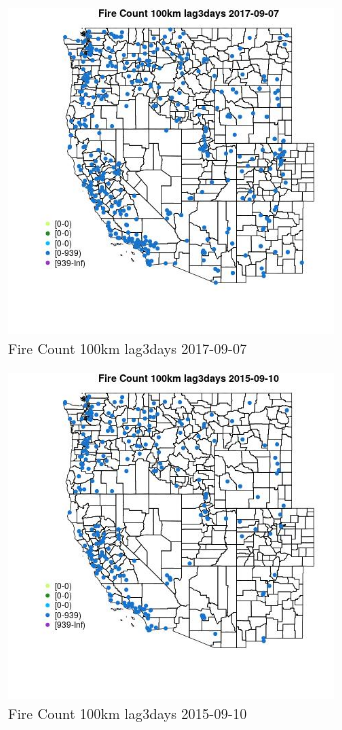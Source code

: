 \begin{figure} 
\centering  
\includegraphics[width=0.77\textwidth]{Code_Outputs/Report_ML_input_PM25_Step4_part_e_de_duplicated_aves_compiled_2019-05-21wNAs_MapObsFire_Count_100km_lag3days2017-09-07.jpg} 
\caption{\label{fig:Report_ML_input_PM25_Step4_part_e_de_duplicated_aves_compiled_2019-05-21wNAsMapObsFire_Count_100km_lag3days2017-09-07}Fire Count 100km lag3days 2017-09-07} 
\end{figure} 
 

\begin{figure} 
\centering  
\includegraphics[width=0.77\textwidth]{Code_Outputs/Report_ML_input_PM25_Step4_part_e_de_duplicated_aves_compiled_2019-05-21wNAs_MapObsFire_Count_100km_lag3days2015-09-10.jpg} 
\caption{\label{fig:Report_ML_input_PM25_Step4_part_e_de_duplicated_aves_compiled_2019-05-21wNAsMapObsFire_Count_100km_lag3days2015-09-10}Fire Count 100km lag3days 2015-09-10} 
\end{figure} 
 

